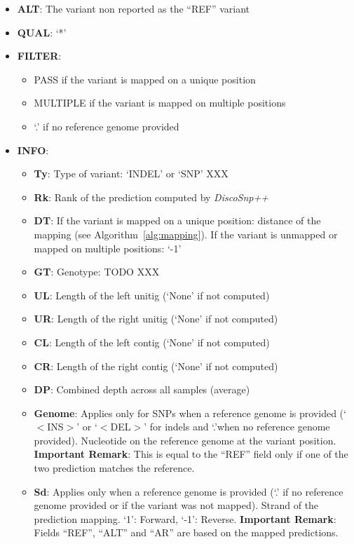 \documentclass{bmcart}
\newcommand{\discopp}{{\it DiscoSnp++}\xspace}
\begin{document}
\begin{itemize}
\begin{itemize}
	\end{itemize}
	Remark: the REF (and ALT) sequences are extracted from the reference genome is forward strand. If the reverse complement of the prediction is mapped, the reported REF and ALT sequences correspond to the reverse complement of the \discopp predictions.
	\item \textbf{ALT}: The variant non reported as the ``REF'' variant
	\item \textbf{QUAL}: `*'
	\item \textbf{FILTER}: 
	\begin{itemize}
		\item PASS if the variant is mapped on a unique position
		\item MULTIPLE if the variant is mapped on multiple positions
		\item `.' if no reference genome provided
	\end{itemize}
	\item \textbf{INFO}:
	\begin{itemize}
		\item \textbf{Ty}: Type of variant: `INDEL' or `SNP' XXX
		\item \textbf{Rk}: Rank of the prediction computed by \discopp
		\item \textbf{DT}: 
			If the variant is mapped on a unique position: distance of the mapping (see Algorithm~\ref{alg:mapping}). If the variant is unmapped or mapped on multiple positions: `-1'
		\item \textbf{GT}: Genotype: TODO XXX
		\item \textbf{UL}: Length of the left unitig (`None' if not computed)
		\item \textbf{UR}: Length of the right unitig (`None' if not computed)
		\item \textbf{CL}: Length of the left contig (`None' if not computed)
		\item \textbf{CR}: Length of the right contig (`None' if not computed)
		\item \textbf{DP}: Combined depth across all samples (average)
		\item \textbf{Genome}: Applies only for SNPs when a reference genome is provided (`$<$INS$>$' or `$<$DEL$>$' for indels and `.'when no reference genome provided). Nucleotide on the reference genome at the variant position.   \textbf{Important Remark}: This is equal to the ``REF'' field only if one of the two prediction matches the reference.
		\item \textbf{Sd}: Applies only when a reference genome is provided (`.' if no reference genome provided or if the variant was not mapped). Strand of the prediction mapping. `1': Forward, `-1': Reverse. \textbf{Important Remark}: Fields ``REF'', ``ALT'' and ``AR'' are based on the mapped predictions. %
		
	\end{itemize}
		
	
\end{itemize}
\end{document}

